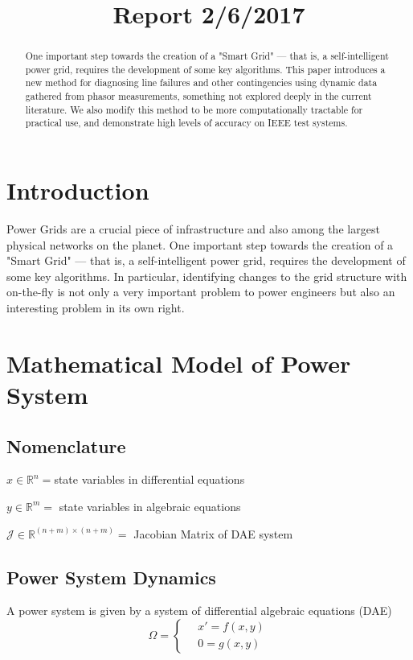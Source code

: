 
\usepackage{amsmath}

\title{Report 2/6/2017}
\author{}
\date{}


\SetEndCharOfAlgoLine{}
\maketitle

\begin{abstract}
One important step towards the creation of a "Smart Grid" --- that is, a self-intelligent power grid, requires the development of some key algorithms. This paper introduces a new method for diagnosing line failures and other contingencies using dynamic data gathered from phasor measurements, something not explored deeply in the current literature. We also modify this method to be more computationally tractable for practical use, and demonstrate high levels of accuracy on IEEE test systems. 
\end{abstract}

\section{Introduction}
Power Grids are a crucial piece of infrastructure and also among the largest physical networks on the planet. One important step towards the creation of a "Smart Grid" --- that is, a self-intelligent power grid, requires the development of some key algorithms. In particular, identifying changes to the grid structure with on-the-fly is not only a very important problem to power engineers but also an interesting problem in its own right. 

\section{Mathematical Model of Power System}
\subsection{Nomenclature}


$x \in \mathbb{R}^n = $state variables in differential equations

$y \in \mathbb{R}^m = $ state variables in algebraic equations

$\mathcal{J} \in \mathbb{R}^{(n+m) \times (n+m)} =$ Jacobian Matrix of DAE system

\subsection{Power System Dynamics}
A power system is given by a system of differential algebraic equations (DAE)
\begin{equation}
  \Omega=\begin{cases}
               \quad x' = f(x,y)\\
               \quad 0 = g(x,y)
            \end{cases}
            \label{DAE}
\end{equation}

